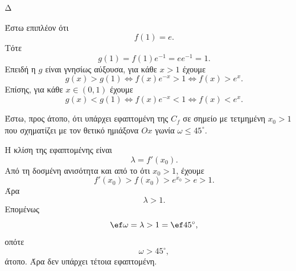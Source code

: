 \begin{thema}{Δ}
\begin{erwthma}
\item Έστω επιπλέον ότι
\[
f(1)=e.
\]
Τότε
\[
g(1)=f(1)e^{-1}=ee^{-1}=1.
\]
Επειδή η $g$ είναι γνησίως αύξουσα, για κάθε $x>1$ έχουμε
\[
g(x)>g(1)
\Leftrightarrow f(x)e^{-x}>1
\Leftrightarrow f(x)>e^x.
\]
Επίσης, για κάθε $x\in(0,1)$ έχουμε
\[
g(x)<g(1)
\Leftrightarrow f(x)e^{-x}<1
\Leftrightarrow f(x)<e^x.
\]

Έστω, προς άτοπο, ότι υπάρχει εφαπτομένη της $C_f$ σε σημείο με τετμημένη $x_0>1$ που σχηματίζει με τον θετικό ημιάξονα $Ox$ γωνία $\omega\leq45^\circ$.

Η κλίση της εφαπτομένης είναι
\[
\lambda=f'(x_0).
\]
Από τη δοσμένη ανισότητα και από το ότι $x_0>1$, έχουμε
\[
f'(x_0)>f(x_0)>e^{x_0}>e>1.
\]
Άρα
\[
\lambda>1.
\]
Επομένως
\[
\ef\omega=\lambda>1=\ef45^\circ,
\]
οπότε
\[
\omega>45^\circ,
\]
άτοπο. Άρα δεν υπάρχει τέτοια εφαπτομένη.
\end{erwthma}
\end{thema}
